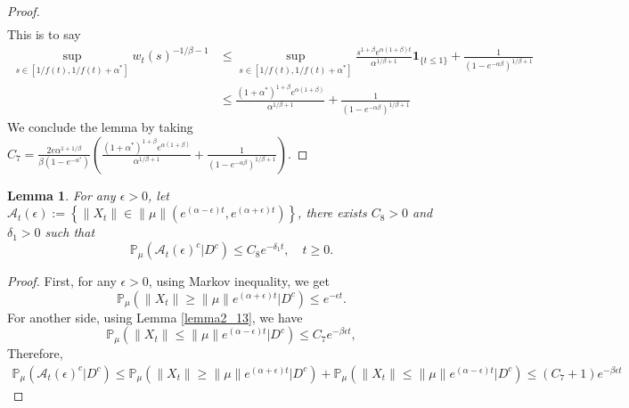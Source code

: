 \documentclass[12pt, a4paper]{amsart}
\newtheorem{lem}[thm]{Lemma}
\theoremstyle{definition}
\numberwithin{equation}{section}
\begin{document}
\begin{proof}
\begin{align*}
\end{align*}
This is to say
\begin{align*}
    \sup_{s\in [1/f(t),1/f(t)+\alpha^*]}w_t(s)^{-1/\beta-1}&\leq\sup_{s\in [1/f(t),1/f(t)+\alpha^*]}\frac{s^{1+\beta}e^{\alpha(1+\beta)t}}{\alpha^{1/\beta +1}}\mathbf{1}_{\{t\leq 1\}}+\frac{1}{(1-e^{-\alpha\beta })^{1/\beta+1}}\\
    &\leq \frac{(1+\alpha^*)^{1+\beta}e^{\alpha(1+\beta)}}{\alpha^{1/\beta+1}}+\frac{1}{(1-e^{-\alpha\beta })^{1/\beta+1}}
\end{align*}
We conclude the lemma by taking $C_7= \frac{2 e \alpha^{1+1/\beta}}{\beta (1-e^{-\alpha^*})}\left(\frac{(1+\alpha^*)^{1+\beta}e^{\alpha(1+\beta)}}{\alpha^{1/\beta+1}}+\frac{1}{(1-e^{-\alpha\beta })^{1/\beta+1}}\right)$.
\end{proof}
\begin{lem}\label{lemma28}
  For any $\epsilon>0$, let $\mathcal{A}_t(\epsilon):=\left\{ \|X_t\|\in \|\mu\|\left(e^{(\alpha-\epsilon)t},e^{(\alpha+\epsilon)t}\right)\right\}$, there exists $C_8>0$ and $\delta_1>0$ such that
  $$\mathbb{P}_{\mu}\left(\mathcal{A}_t(\epsilon)^c|D^c\right)\leq C_8 e^{-\delta_1 t},\quad t\geq 0.$$
\end{lem}

\begin{proof}
    First, for any $\epsilon>0$, using Markov inequality, we get
    $$\mathbb{P}_{\mu}(\|X_t\|\geq\|\mu\|e^{(\alpha+\epsilon)t}|D^c)\leq e^{-\epsilon t}.$$
    For another side, using Lemma \ref{lemma2_13}, we have
    $$\mathbb{P}_{\mu}\left(\|X_t\|\leq \|\mu\|e^{(\alpha-\epsilon)t}|D^c\right)\leq C_7 e^{-\beta\epsilon t}, $$
Therefore,
\begin{align*}
    \mathbb{P}_{\mu}\left(\mathcal{A}_t(\epsilon)^c|D^c\right)\leq \mathbb{P}_{\mu}(\|X_t\|\geq\|\mu\|e^{(\alpha+\epsilon)t}|D^c)+\mathbb{P}_{\mu}\left(\|X_t\|\leq \|\mu\|e^{(\alpha-\epsilon)t}|D^c\right)\leq(C_7+1)e^{-\beta \epsilon t }
\end{align*}
\end{proof}

\end{document}
